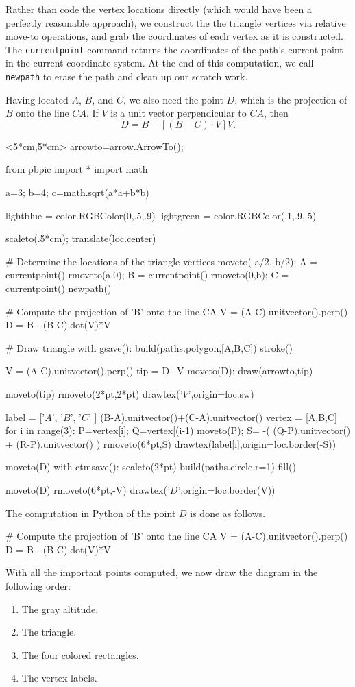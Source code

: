 \documentclass[12pt]{article}
\def\code#1{{\tt #1}}
\begin{document}
Rather than code the vertex locations directly (which would have been
a perfectly reasonable approach), we construct the the triangle vertices
via relative move-to operations, and grab the 
coordinates of each vertex as it is constructed.  The \code{currentpoint} command returns the coordinates of the path's current point in the current coordinate system.  
At the end of this computation, we call \code{newpath} to erase the
path and clean up our scratch work.

Having located $A$, $B$, and $C$, we also need the point $D$, which 
is the projection of $B$ onto the line $CA$.  If $V$ is a unit vector
perpendicular to $CA$, then
$$
D = B-[ (B-C)\cdot V] V.
$$

\hfil\begin{pbpic}<5*cm,5*cm>
arrowto=arrow.ArrowTo();

from pbpic import *
import math

a=3; b=4; c=math.sqrt(a*a+b*b)

lightblue = color.RGBColor(0,.5,.9)
lightgreen = color.RGBColor(.1,.9,.5)

scaleto(.5*cm); translate(loc.center)

# Determine the locations of the triangle vertices
moveto(-a/2,-b/2); A = currentpoint()
rmoveto(a,0); B = currentpoint()
rmoveto(0,b); C = currentpoint()
newpath()

# Compute the projection of 'B' onto the line CA
V = (A-C).unitvector().perp()
D = B - (B-C).dot(V)*V

# Draw triangle
with gsave():
  build(paths.polygon,[A,B,C])
  stroke()

V = (A-C).unitvector().perp()
tip = D+V
moveto(D); draw(arrowto,tip)

moveto(tip)
rmoveto(2*pt,2*pt)
drawtex('$V$',origin=loc.sw)

label = ['$A$', '$B$', '$C$' ]
(B-A).unitvector()+(C-A).unitvector()
vertex = [A,B,C]
for i in range(3):
  P=vertex[i]; Q=vertex[(i-1)%
  moveto(P);
  S= -( (Q-P).unitvector() + (R-P).unitvector() )
  rmoveto(6*pt,S)
  drawtex(label[i],origin=loc.border(-S))

moveto(D)
with ctmsave():
  scaleto(2*pt)
  build(paths.circle,r=1)
  fill()

moveto(D)
rmoveto(6*pt,-V)
drawtex('$D$',origin=loc.border(V))

\end{pbpic}

The computation in Python of the point $D$ is done as follows.
\begin{snippet}
# Compute the projection of 'B' onto the line CA
V = (A-C).unitvector().perp()
D = B - (B-C).dot(V)*V
\end{snippet}
With all the important points computed, we now draw the diagram
in the following order:
\begin{enumerate}
  \item The gray altitude.
  \item The triangle.
  \item The four colored rectangles.
  \item The vertex labels.
\end{enumerate}
\end{document}
